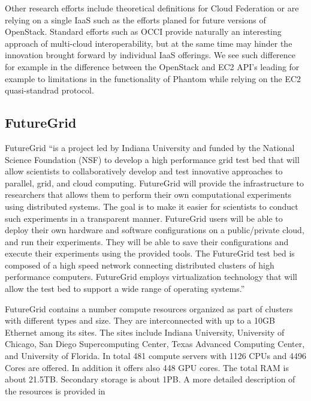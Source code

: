 \documentclass{tex/sig-alternate-2013}
\newcommand{\todo}[1]{{\color{red}{#1}}}
\begin{document}
Other research efforts include theoretical definitions for Cloud
Federation \cite{kurze2011cloudfederation} or are relying on a single
IaaS such as the efforts planed for future versions of
OpenStack. Standard efforts such as OCCI provide naturally an
interesting approach of multi-cloud interoperability, but at the same
time may hinder the innovation brought forward by individual IaaS
offerings. We see such difference for example in the difference
between the OpenStack and EC2 API's leading for example to limitations
in the functionality of Phantom while relying on the EC2 quasi-standrad protocol.

\todo{DO NOT READ TILL YOU FIND ANOTHER READ}

\subsection{FutureGrid}



FutureGrid \cite{las2010gce,las12fg-bookchapter} ``is a project led by
Indiana University and funded by the National Science Foundation (NSF)
to develop a high performance grid test bed that will allow scientists
to collaboratively develop and test innovative approaches to parallel,
grid, and cloud computing. FutureGrid will provide the infrastructure
to researchers that allows them to perform their own computational
experiments using distributed systems. The goal is to make it easier
for scientists to conduct such experiments in a transparent manner.
FutureGrid users will be able to deploy their own hardware and
software configurations on a public/private cloud, and run their
experiments. They will be able to save their configurations and
execute their experiments using the provided tools. The FutureGrid
test bed is composed of a high speed network connecting distributed
clusters of high performance computers. FutureGrid employs
virtualization technology that will allow the test bed to support a
wide range of operating systems.''



FutureGrid contains a number compute resources organized as part of
clusters with different types and size. They are interconnected with up to a 10GB Ethernet among its sites. The sites include Indiana University, University of Chicago, San Diego Supercomputing Center, Texas Advanced Computing Center, and University of Florida.
In total 481 compute servers with 1126 CPUs and 4496 Cores are
offered. In addition it offers also 448 GPU cores. The total RAM is
about 21.5TB. Secondary storage is about 1PB. A more detailed
description of the resources is provided in
\cite{vonLaszewski-bigdata-bookchapter2014}
\end{document}
